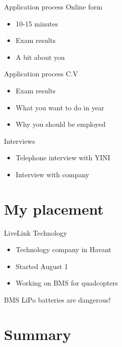\documentclass{beamer}
\begin{document}
\begin{frame}{Application process}
	Online form
	\begin{itemize}
		\item
			10-15 minutes
		\item
			Exam results
		\item
			A bit about you	
	\end{itemize}
\end{frame}

\begin{frame}{Application process}
	C.V
	\begin{itemize}
		\item
			Exam results
		\item
			What you want to do in year
		\item 
			Why you should be employed
	\end{itemize}
\end{frame}

\begin{frame}{Interviews}
	\begin{itemize}
		\item
			Telephone interview with YINI
		\item 
			Interview with company
	\end{itemize}
\end{frame}

\section{My placement}
\begin{frame}{LiveLink Technology}
	\begin{itemize}
		\item
			Technology company in Havant
		\item
			Started August 1
		\item
			Working on BMS for quadcopters
	\end{itemize}
\end{frame}

\begin{frame}{BMS}
	LiPo batteries are dangerous!
	\centering
\end{frame}

\section*{Summary}
\end{document}
